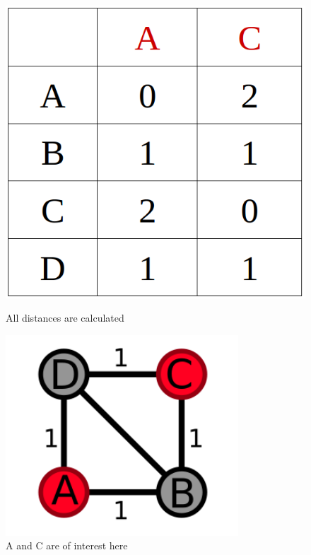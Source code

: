 \begin{figure}[h]
	\centering
	\begin{minipage}[b]{0.29\textwidth}
		\includegraphics[width=\textwidth]{figures/distanceTableWithoutCanceldist.png}
		\caption{All distances are calculated}
	\end{minipage}
	\hfill
	\begin{minipage}[b]{0.36\textwidth}
		\includegraphics[width=\textwidth]{figures/meshSCDC.png}
		\caption{A and C are of interest here}
	\end{minipage}
\end{figure}

